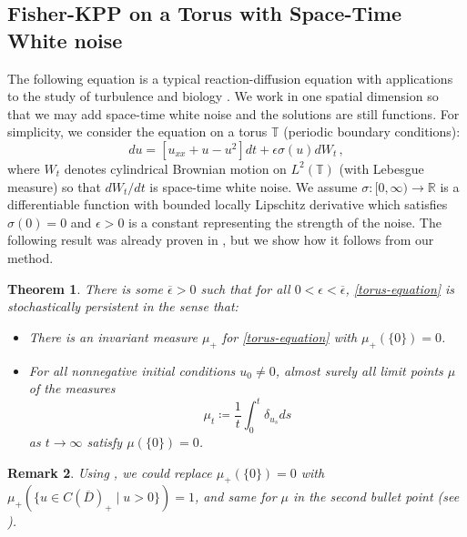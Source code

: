 \documentclass[final]{amsart}
\newtheorem{thm}{Theorem}
\newtheorem{rem}[thm]{Remark}
\numberwithin{thm}{section}
\numberwithin{equation}{section}
\newcommand{\R}{\mathbb{R}}
\newcommand{\T}{\mathbb{T}}
\newcommand{\cdom}{C(\overline D)_+}
\begin{document}
\subsection{Fisher-KPP on a Torus with Space-Time White noise}\label{example-torus}
The following equation is a typical reaction-diffusion equation with applications to the study of turbulence \cite{space-time, physics-interpretation} and biology \cite{biology-waves}. We work in one spatial dimension so that we may add space-time white noise and the solutions are still functions. For simplicity, we consider the equation on a torus $\T$ (periodic boundary conditions):
\begin{equation}\label{torus-equation}
    du = [u_{xx} + u - u^2]dt + \epsilon \sigma(u)dW_t \,,
\end{equation}
where
$W_t$ denotes cylindrical Brownian motion on $L^2(\T)$ (with Lebesgue measure) so that $dW_t/dt$ is space-time white noise. We assume $\sigma: [0,\infty) \to \R$ is a differentiable function with bounded locally Lipschitz derivative which satisfies $\sigma(0) = 0$ and $\epsilon > 0$ is a constant representing the strength of the noise. The following result was already proven in \cite[Theorem 2.4]{space-time}, but we show how it follows from our method. 

\begin{thm}
\label{torus-thm}
    There is some $\overline \epsilon > 0$ such that for all $0 < \epsilon < \overline \epsilon$, \eqref{torus-equation} is stochastically persistent in the sense that: \begin{itemize}
        \item There is an invariant measure $\mu_+$ for \eqref{torus-equation} with $\mu_+(\{0\}) = 0$.
        \item For all nonnegative initial conditions $u_0 \neq 0$, almost surely all limit points $\mu$ of the measures $$\mu_t \coloneqq \frac{1}{t}\int_0^t \delta_{u_s}ds$$ as $t \to \infty$ satisfy $\mu(\{0\}) = 0$.
    
    \end{itemize}
    
\end{thm}

\begin{rem}
    Using \cite[Theorem 2.3]{space-time}, we could replace $\mu_+(\{0\}) = 0$ with $\mu_+(\{u \in \cdom \mid u > 0\}) = 1$, and same for $\mu$ in the second bullet point (see ).
\end{rem}
\end{document}
